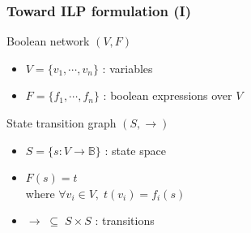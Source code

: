 \documentclass{beamer}
\begin{document}
\begin{frame}
  \frametitle{Toward ILP formulation (I)}
  \begin{block}{Boolean network $ (V, F) $}
    \begin{itemize}
      \item $ V = \{ v_1, \cdots, v_n \} $ : variables
      \item $ F = \{ f_1, \cdots, f_n \} $ : boolean expressions over $ V $
    \end{itemize}
  \end{block}
  \pause
  \begin{block}{State transition graph $ (S, \rightarrow) $}
    \begin{overlayarea}{6cm}{4cm}
      \begin{itemize}
      \item $ S = \{ s : V \longrightarrow \mathbb{B} \} $ : state space
      \item $ F(s) = t $ \\
        where $ \forall v_i \in V, \; t(v_i) = f_i(s) $
      \item $ \rightarrow \; \subseteq \; S \times S $ : transitions
        \pause
        \begin{itemize}
          \setlength{\abovedisplayskip}{-11pt}
          \setlength{\belowdisplayskip}{0pt}
          \setlength{\abovedisplayshortskip}{0pt}
          \setlength{\belowdisplayshortskip}{0pt}
        \end{itemize}
      \end{itemize}
    \end{overlayarea}
  \end{block}
\end{frame}
\end{document}
